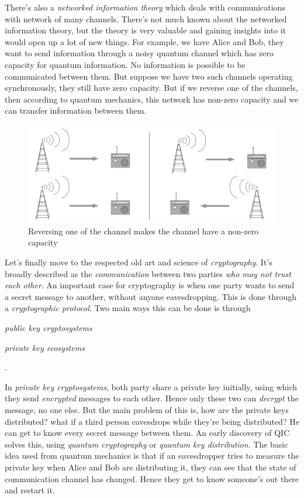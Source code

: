 There's also a \textit{networked information theory} which deals with communications with network of many channels. There's not much known about the networked information theory, but the theory is very valuable and gaining insights into it would open up a lot of new things. For example, we have Alice and Bob, they want to send information through a noisy quantum channel which has zero capacity for quantum information. No information is possible to be communicated between them. But suppose we have two such channels operating synchronously, they still have zero capacity. But if we reverse one of the channels, then according to quantum mechanics, this network has non-zero capacity and we can transfer information between them.

\begin{figure}[h]
    \centering
    \includegraphics[width=\textwidth]{images/reversing.png} 
    \caption{Reversing one of the channel makes the channel have a non-zero capacity}
    \label{fig:reversing}
\end{figure}

Let's finally move to the respected old art and science of \textit{cryptography}. It's broadly described as the \textit{communication} between two parties \textit{who may not trust each other}. An important case for cryptography is when one party wants to send a secret message to another, without anyone eavesdropping. This is done through a \textit{cryptographic protocol}. Two main ways this can be done is through \begin{enumerate*}
    [label=(\alph*)] \item \textit{public key cryptosystems} \item \textit{private key ecosystems}
\end{enumerate*}.

In \textit{private key cryptosystems}, both party share a private key initially, using which they send \textit{encrypted} messages to each other. Hence only these two can \textit{decrypt} the message, no one else. But the main problem of this is, how are the private keys distributed? what if a third person eavesdrops while they're being distributed? He can get to know every secret message between them. An early discovery of QIC solves this, using \textit{quantum cryptography} or \textit{quantum key distribution}. The basic idea used from quantum mechanics is that if an eavesdropper tries to measure the private key when Alice and Bob are distributing it, they can see that the state of communication channel has changed. Hence they get to know someone's out there and restart it. 

